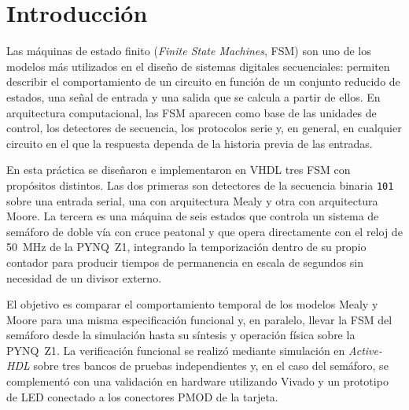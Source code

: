 \documentclass[12pt,letterpaper]{article}
\begin{document}
\section{Introducción}
Las máquinas de estado finito (\textit{Finite State Machines}, FSM) son uno de los modelos más utilizados en el diseño de sistemas digitales secuenciales: permiten describir el comportamiento de un circuito en función de un conjunto reducido de estados, una señal de entrada y una salida que se calcula a partir de ellos. En arquitectura computacional, las FSM aparecen como base de las unidades de control, los detectores de secuencia, los protocolos serie y, en general, en cualquier circuito en el que la respuesta dependa de la historia previa de las entradas.

En esta práctica se diseñaron e implementaron en VHDL tres FSM con propósitos distintos. Las dos primeras son detectores de la secuencia binaria \texttt{101} sobre una entrada serial, una con arquitectura Mealy y otra con arquitectura Moore. La tercera es una máquina de seis estados que controla un sistema de semáforo de doble vía con cruce peatonal y que opera directamente con el reloj de \SI{50}{\mega\hertz} de la PYNQ~Z1, integrando la temporización dentro de su propio contador para producir tiempos de permanencia en escala de segundos sin necesidad de un divisor externo.

El objetivo es comparar el comportamiento temporal de los modelos Mealy y Moore para una misma especificación funcional y, en paralelo, llevar la FSM del semáforo desde la simulación hasta su síntesis y operación física sobre la PYNQ~Z1. La verificación funcional se realizó mediante simulación en \textit{Active-HDL} sobre tres bancos de pruebas independientes y, en el caso del semáforo, se complementó con una validación en hardware utilizando Vivado y un prototipo de LED conectado a los conectores PMOD de la tarjeta.
\end{document}
